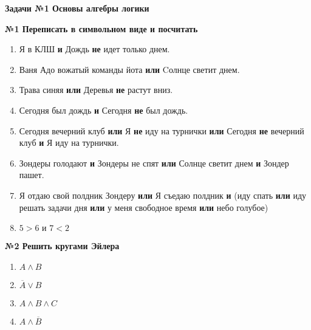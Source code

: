 



    \begin{center}
        \textbf{Задачи №1 Основы алгебры логики}
    \end{center}

    \begin{center}
        \textbf{№1 Переписать в символьном виде и посчитать}
    \end{center}

    \begin{enumerate}
        \item Я в КЛШ \textbf{и} Дождь \textbf{не} идет только днем.

        \item Ваня Адо вожатый команды йота \textbf{или} Cолнце светит днем.

        \item Трава синяя \textbf{или} Деревья \textbf{не} растут вниз.

        \item Сегодня был дождь \textbf{и} Сегодня \textbf{не} был дождь.

        \item Сегодня вечерний клуб \textbf{или} Я \textbf{не} иду на турнички \textbf{или}
        Сегодня \textbf{не} вечерний клуб \textbf{и} Я иду на турнички.

        \item Зондеры голодают \textbf{и} Зондеры не спят \textbf{или} Солнце светит днем \textbf{и} {Зондер пашет}.

        \item Я отдаю свой полдник Зондеру \textbf{или}
        Я съедаю полдник \textbf{и} (иду спать
        \textbf{или} иду решать задачи дня \textbf{или} у меня свободное время \textbf{или} небо голубое)

        \item  $5 > 6 \textbf{ и } 7 < 2$

    \end{enumerate}
    \begin{center}
        \textbf{№2 Решить кругами Эйлера}
    \end{center}

    \begin{enumerate}
        \item $A \wedge B$
        \item $\overline A \vee B$
        \item $A \wedge B \wedge C$
        \item $A \wedge \overline B$
    \end{enumerate}


